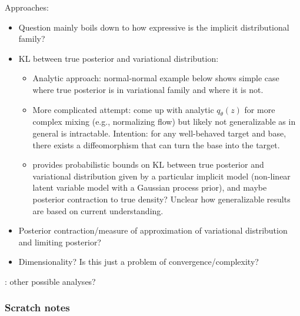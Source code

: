 \documentclass[10pt]{article}
\begin{document}
Approaches:
\begin{itemize}

\item
Question mainly boils down to how expressive is the implicit distributional family?

\item
KL between true posterior and variational distribution:
\begin{itemize}
\item
Analytic approach: normal-normal example below shows simple case where true posterior is in variational family and where it is not.
\item
More complicated attempt: come up with analytic $q_\theta(z)$ for more complex mixing (e.g., normalizing flow) but likely not generalizable as in general is intractable. Intention: for any well-behaved target and base, there exists a diffeomorphism that can turn the base into the target.
\item
\citet{Plummer:2021} provides probabilistic bounds on KL between true posterior and variational distribution given by a particular implicit model (non-linear latent variable model with a Gaussian process prior), and maybe posterior contraction to true density? Unclear how generalizable results are based on current understanding.
\end{itemize}

\item
Posterior contraction/measure of approximation of variational distribution and limiting posterior?

\item
Dimensionality? Is this just a problem of convergence/complexity?

\end{itemize}

\todo: other possible analyses?

\subsubsection{Scratch notes}
\end{document}

